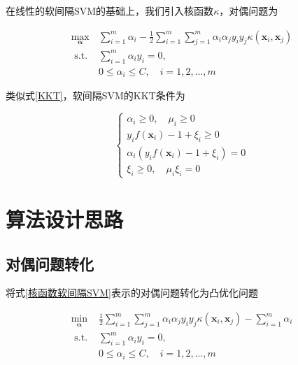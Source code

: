 \documentclass{ctexart}
\begin{document}
	在线性的软间隔SVM的基础上，我们引入核函数$\kappa$，对偶问题为
	
	\begin{equation}
		\begin{aligned}
			\max _{\boldsymbol{\alpha}} & \sum_{i=1}^{m} \alpha_{i}-\frac{1}{2} \sum_{i=1}^{m} \sum_{j=1}^{m} \alpha_{i} \alpha_{j} y_{i} y_{j} \kappa\left(\boldsymbol{x}_{i},\boldsymbol{x}_{j} \right)\\
			\text { s.t. } & \sum_{i=1}^{m} \alpha_{i} y_{i}=0, \\
			& 0\leqslant\alpha_{i} \leqslant C, \quad i=1,2, \ldots, m
		\end{aligned}
		\label{核函数软间隔SVM}
	\end{equation}

	类似式\eqref{KKT}，软间隔SVM的KKT条件为
	
	\begin{equation}
		\left\{\begin{array}{l}
			\alpha_{i} \geqslant 0,\quad \mu_i\geqslant 0 \\
			y_{i} f\left(\boldsymbol{x}_{i}\right)-1+\xi_i \geqslant 0 \\
			\alpha_{i}\left(y_{i} f\left(\boldsymbol{x}_{i}\right)-1+\xi_i\right)=0\\
			\xi_i\geqslant 0,\quad\mu_i\xi_{i}=0
		\end{array}\right.
		\label{软间隔KKT}
	\end{equation}

	\section{算法设计思路}
	
	\subsection{对偶问题转化}
	
	将式\eqref{核函数软间隔SVM}表示的对偶问题转化为凸优化问题
	
	\begin{equation}
		\begin{aligned}
			\min _{\boldsymbol{\alpha}}\  & \frac{1}{2} \sum_{i=1}^{m} \sum_{j=1}^{m} \alpha_{i} \alpha_{j} y_{i} y_{j} \kappa\left(\boldsymbol{x}_{i},\boldsymbol{x}_{j} \right)-\sum_{i=1}^{m} \alpha_{i}\\
			\text { s.t. } & \sum_{i=1}^{m} \alpha_{i} y_{i}=0, \\
			& 0\leqslant\alpha_{i} \leqslant C, \quad i=1,2, \ldots, m
		\end{aligned}
		\label{凸优化}
	\end{equation}
\end{document}
